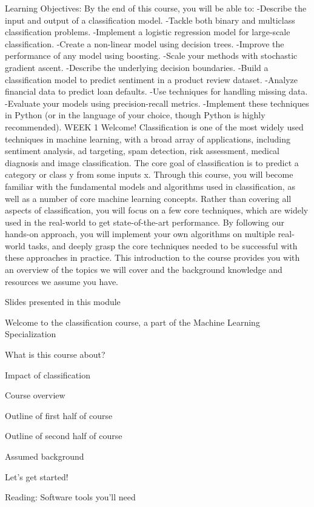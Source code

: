 Learning Objectives: By the end of this course, you will be able to:
   -Describe the input and output of a classification model.
   -Tackle both binary and multiclass classification problems.
   -Implement a logistic regression model for large-scale classification.  
   -Create a non-linear model using decision trees.
   -Improve the performance of any model using boosting.
   -Scale your methods with stochastic gradient ascent.
   -Describe the underlying decision boundaries.  
   -Build a classification model to predict sentiment in a product review dataset.  
   -Analyze financial data to predict loan defaults.
   -Use techniques for handling missing data.
   -Evaluate your models using precision-recall metrics.
   -Implement these techniques in Python (or in the language of your choice, though Python is highly recommended).
WEEK 1
Welcome!
Classification is one of the most widely used techniques in machine learning, with a broad array of applications, including sentiment analysis, ad targeting, spam detection, risk assessment, medical diagnosis and image classification. The core goal of classification is to predict a category or class y from some inputs x. Through this course, you will become familiar with the fundamental models and algorithms used in classification, as well as a number of core machine learning concepts. Rather than covering all aspects of classification, you will focus on a few core techniques, which are widely used in the real-world to get state-of-the-art performance. By following our hands-on approach, you will implement your own algorithms on multiple real-world tasks, and deeply grasp the core techniques needed to be successful with these approaches in practice. This introduction to the course provides you with an overview of the topics we will cover and the background knowledge and resources we assume you have.
\item Slides presented in this module
\item Welcome to the classification course, a part of the Machine Learning Specialization
\item What is this course about?
\item Impact of classification
\item Course overview
\item Outline of first half of course
\item Outline of second half of course
\item Assumed background
\item Let's get started!
\item Reading: Software tools you'll need
